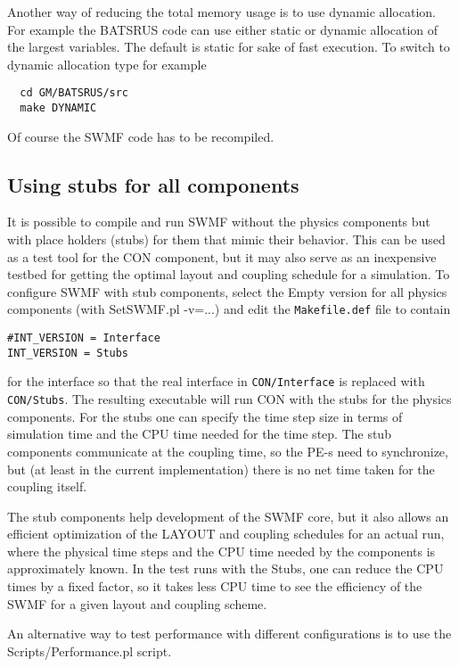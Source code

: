 Another way of reducing the total memory usage is to use dynamic
allocation. For example the BATSRUS code can use either static or
dynamic allocation of the largest variables. The default is static
for sake of fast execution. To switch to dynamic allocation type
for example
\begin{verbatim}
  cd GM/BATSRUS/src
  make DYNAMIC
\end{verbatim}
Of course the SWMF code has to be recompiled.

\subsection{Using stubs for all components}

It is possible to compile and run SWMF without the physics components
but with place holders (stubs) for them that mimic their behavior.
This can be used as a test tool for the CON component, but it may
also serve as an inexpensive testbed for getting the optimal layout
and coupling schedule for a simulation. To configure SWMF with 
stub components, select the Empty version for all physics components
(with SetSWMF.pl -v=...) and edit the {\tt Makefile.def} file to
contain
\begin{verbatim}
#INT_VERSION = Interface
INT_VERSION = Stubs
\end{verbatim}
for the interface so that the real interface in {\tt CON/Interface}
is replaced with {\tt CON/Stubs}.
The resulting executable will run CON with 
the stubs for the physics components. For the stubs one can
specify the time step size in terms of simulation time and the
CPU time needed for the time step. The stub components communicate
at the coupling time, so the PE-s need to synchronize, but 
(at least in the current implementation) there is no net time taken
for the coupling itself. 

The stub components help development of the SWMF core, but it also
allows an efficient optimization of the LAYOUT and coupling
schedules for an actual run, where the physical time steps
and the CPU time needed by the components is approximately known.
In the test runs with the Stubs, one can reduce the CPU times by 
a fixed factor, so it takes less CPU time to see the efficiency of the 
SWMF for a given layout and coupling scheme.

An alternative way to test performance with different configurations is
to use the Scripts/Performance.pl script.